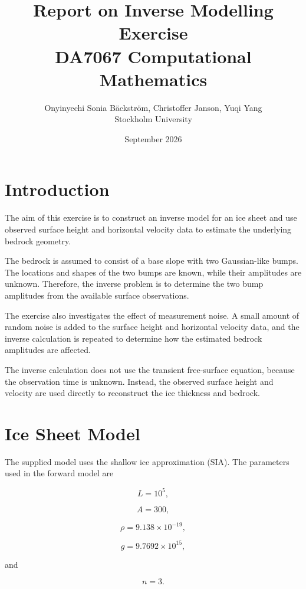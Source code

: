 \documentclass{article}
\title{\textbf{Report on Inverse Modelling Exercise}\\

\large DA7067 Computational Mathematics}
\author{ Onyinyechi Sonia Bäckström, Christoffer Janson, Yuqi Yang \\
Stockholm University}
\date{September 2026}
\begin{document}
\maketitle
\newpage
\section{Introduction}
The aim of this exercise is to construct an inverse model for an ice
sheet and use observed surface height and horizontal velocity data to
estimate the underlying bedrock geometry.

The bedrock is assumed to consist of a base slope with two Gaussian-like
bumps. The locations and shapes of the two bumps are known, while their
amplitudes are unknown. Therefore, the inverse problem is to determine
the two bump amplitudes from the available surface observations.

The exercise also investigates the effect of measurement noise. A small
amount of random noise is added to the surface height and horizontal
velocity data, and the inverse calculation is repeated to determine how
the estimated bedrock amplitudes are affected.

The inverse calculation does not use the transient free-surface equation,
because the observation time is unknown. Instead, the observed surface
height and velocity are used directly to reconstruct the ice thickness
and bedrock.
\section{Ice Sheet Model}

The supplied model uses the shallow ice approximation (SIA). The
parameters used in the forward model are

\begin{equation}
L = 10^5,
\end{equation}

\begin{equation}
A = 300,
\end{equation}

\begin{equation}
\rho = 9.138\times10^{-19},
\end{equation}

\begin{equation}
g = 9.7692\times10^{15},
\end{equation}

and

\begin{equation}
n=3.
\end{equation}
\end{document}
